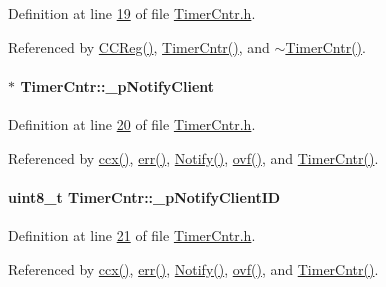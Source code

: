Definition at line \hyperlink{_timer_cntr_8h_source_l00019}{19} of file \hyperlink{_timer_cntr_8h_source}{TimerCntr.h}.



Referenced by \hyperlink{_timer_cntr_8cpp_source_l00200}{CCReg()}, \hyperlink{_timer_cntr_8cpp_source_l00116}{TimerCntr()}, and \hyperlink{_timer_cntr_8cpp_source_l00134}{$\sim$TimerCntr()}.

\hypertarget{class_timer_cntr_ab0667571f2dab6ca9f759d9b2c8ce59f}{
\paragraph[{\_\-pNotifyClient}]{$\ast$ {\bf TimerCntr::\_\-pNotifyClient}}\hfill}
\label{class_timer_cntr_ab0667571f2dab6ca9f759d9b2c8ce59f}


Definition at line \hyperlink{_timer_cntr_8h_source_l00020}{20} of file \hyperlink{_timer_cntr_8h_source}{TimerCntr.h}.



Referenced by \hyperlink{_timer_cntr_8cpp_source_l00245}{ccx()}, \hyperlink{_timer_cntr_8cpp_source_l00233}{err()}, \hyperlink{_timer_cntr_8cpp_source_l00227}{Notify()}, \hyperlink{_timer_cntr_8cpp_source_l00239}{ovf()}, and \hyperlink{_timer_cntr_8cpp_source_l00116}{TimerCntr()}.

\hypertarget{class_timer_cntr_a98b954b9492a11842e511fa21d0131cc}{
\paragraph[{\_\-pNotifyClientID}]{\setlength{\rightskip}{0pt plus 5cm}uint8\_\-t {\bf TimerCntr::\_\-pNotifyClientID}}\hfill}
\label{class_timer_cntr_a98b954b9492a11842e511fa21d0131cc}


Definition at line \hyperlink{_timer_cntr_8h_source_l00021}{21} of file \hyperlink{_timer_cntr_8h_source}{TimerCntr.h}.



Referenced by \hyperlink{_timer_cntr_8cpp_source_l00245}{ccx()}, \hyperlink{_timer_cntr_8cpp_source_l00233}{err()}, \hyperlink{_timer_cntr_8cpp_source_l00227}{Notify()}, \hyperlink{_timer_cntr_8cpp_source_l00239}{ovf()}, and \hyperlink{_timer_cntr_8cpp_source_l00116}{TimerCntr()}.

